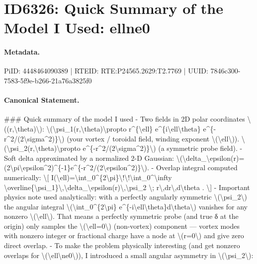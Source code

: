 \section*{ID6326: Quick Summary of the Model I Used: ellne0}
\paragraph{Metadata.}
PiID: 4448464090389 | RTEID: RTE:P24565.2629:T2.7769 | UUID: 7846c300-7583-5f9e-b266-21a76a3825f0

\paragraph{Canonical Statement.}
\#\#\# Quick summary of the model I used - Two fields in 2D polar coordinates \textbackslash{}((r,\textbackslash{}theta)\textbackslash{}): \textbackslash{}(\textbackslash{}psi\_1(r,\textbackslash{}theta)\textbackslash{}propto r\textasciicircum{}\{\textbackslash{}ell\} e\textasciicircum{}\{i\textbackslash{}ell\textbackslash{}theta\} e\textasciicircum{}\{-r\textasciicircum{}2/(2\textbackslash{}sigma\textasciicircum{}2)\}\textbackslash{}) (your vortex / toroidal field, winding exponent \textbackslash{}(\textbackslash{}ell\textbackslash{})). \textbackslash{}(\textbackslash{}psi\_2(r,\textbackslash{}theta)\textbackslash{}propto e\textasciicircum{}\{-r\textasciicircum{}2/(2\textbackslash{}sigma\textasciicircum{}2)\}\textbackslash{}) (a symmetric probe field). - Soft delta approximated by a normalized 2-D Gaussian: \textbackslash{}(\textbackslash{}delta\_\textbackslash{}epsilon(r)=(2\textbackslash{}pi\textbackslash{}epsilon\textasciicircum{}2)\textasciicircum{}\{-1\}e\textasciicircum{}\{-r\textasciicircum{}2/(2\textbackslash{}epsilon\textasciicircum{}2)\}\textbackslash{}). - Overlap integral computed numerically: \textbackslash{}[ I(\textbackslash{}ell)=\textbackslash{}int\_0\textasciicircum{}\{2\textbackslash{}pi\}\textbackslash{}!\textbackslash{}!\textbackslash{}int\_0\textasciicircum{}\textbackslash{}infty \textbackslash{}overline\{\textbackslash{}psi\_1\}\textbackslash{},\textbackslash{}delta\_\textbackslash{}epsilon(r)\textbackslash{},\textbackslash{}psi\_2 \textbackslash{}; r\textbackslash{},dr\textbackslash{},d\textbackslash{}theta . \textbackslash{}] - Important physics note used analytically: with a perfectly angularly symmetric \textbackslash{}(\textbackslash{}psi\_2\textbackslash{}) the angular integral \textbackslash{}(\textbackslash{}int\_0\textasciicircum{}\{2\textbackslash{}pi\} e\textasciicircum{}\{-i\textbackslash{}ell\textbackslash{}theta\}d\textbackslash{}theta\textbackslash{}) vanishes for any nonzero \textbackslash{}(\textbackslash{}ell\textbackslash{}). That means a perfectly symmetric probe (and true δ at the origin) only samples the \textbackslash{}(\textbackslash{}ell=0\textbackslash{}) (non-vortex) component — vortex modes with nonzero integer or fractional charge have a node at \textbackslash{}(r=0\textbackslash{}) and give zero direct overlap. - To make the problem physically interesting (and get nonzero overlaps for \textbackslash{}(\textbackslash{}ell\textbackslash{}ne0\textbackslash{})), I introduced a small angular asymmetry in \textbackslash{}(\textbackslash{}psi\_2\textbackslash{}): 